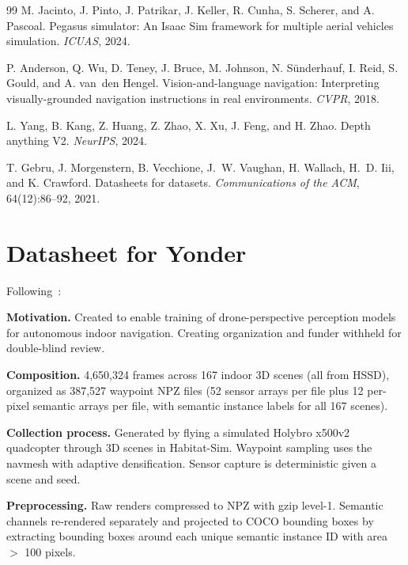 \documentclass{article}
\begin{document}
{\begin{thebibliography}{99}
M. Jacinto, J. Pinto, J. Patrikar, J. Keller, R. Cunha, S. Scherer, and A. Pascoal.
Pegasus simulator: An {Isaac} {Sim} framework for multiple aerial vehicles simulation.
\textit{ICUAS}, 2024.

P. Anderson, Q. Wu, D. Teney, J. Bruce, M. Johnson, N. S{\"u}nderhauf, I. Reid, S. Gould, and A. van~den Hengel.
Vision-and-language navigation: Interpreting visually-grounded navigation instructions in real environments.
\textit{CVPR}, 2018.

L. Yang, B. Kang, Z. Huang, Z. Zhao, X. Xu, J. Feng, and H. Zhao.
Depth anything {V2}.
\textit{NeurIPS}, 2024.

T. Gebru, J. Morgenstern, B. Vecchione, J.~W. Vaughan, H. Wallach, H.~D. Iii, and K. Crawford.
Datasheets for datasets.
\textit{Communications of the ACM}, 64(12):86--92, 2021.

\end{thebibliography}
}



\appendix

\section{Datasheet for Yonder}
\label{sec:datasheet}

Following~\cite{gebru2021datasheets}:

\textbf{Motivation.} Created to enable training of drone-perspective perception models for autonomous indoor navigation. Creating organization and funder withheld for double-blind review.

\textbf{Composition.} 4,650,324 frames across 167 indoor 3D scenes (all from HSSD), organized as 387,527 waypoint NPZ files (52 sensor arrays per file plus 12 per-pixel semantic arrays per file, with semantic instance labels for all 167 scenes).

\textbf{Collection process.} Generated by flying a simulated Holybro x500v2 quadcopter through 3D scenes in Habitat-Sim. Waypoint sampling uses the navmesh with adaptive densification. Sensor capture is deterministic given a scene and seed.

\textbf{Preprocessing.} Raw renders compressed to NPZ with gzip level-1. Semantic channels re-rendered separately and projected to COCO bounding boxes by extracting bounding boxes around each unique semantic instance ID with area $>$ 100 pixels.
\end{document}
